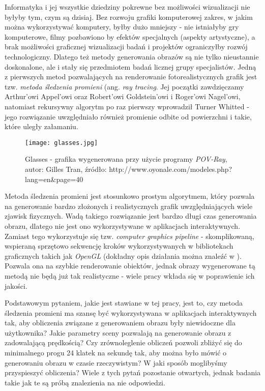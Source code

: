 Informatyka i jej wszystkie dziedziny pokrewne bez możliwości wizualizacji nie byłyby tym, czym są dzisiaj. Bez rozwoju grafiki komputerowej zakres, w jakim można wykorzystywać komputery, byłby dużo mniejszy - nie istniałyby gry komputerowe, filmy pozbawiono by efektów specjalnych (aspekty artystyczne), a brak możliwości graficznej wizualizacji badań i projektów ograniczyłby rozwój technologiczny. Dlatego też metody generowania obrazów są nie tylko nieustannie doskonalone, ale i stały się przedmiotem badań licznej grupy specjalistów. Jedną z pierwszych metod pozwalających na renderowanie fotorealistycznych grafik jest tzw. \emph{metoda śledzenia promieni} (ang. \emph{ray tracing}. Jej początki zawdzięczamy Arthur'owi Appel'owi oraz Robert'owi Goldstein'owi i Roger'owi Nagel'owi, natomiast rekursywny algorytm po raz pierwszy wprowadził Turner Whitted - jego rozwiązanie uwzględniało również promienie odbite od powierzchni i takie, które uległy załamaniu.

\begin{figure}[H]
\centering
\texttt{[image: glasses.jpg]}
\caption{Glasses - grafika wygenerowana przy użycie programy \emph{POV-Ray}, autor: Gilles Tran, źródło: http://www.oyonale.com/modeles.php?lang=en\&page=40}
\end{figure}

Metoda śledzenia promieni jest stosunkowo prostym algorytmem, który pozwala na generowanie bardzo złożonych i realistycznych grafik uwzględniających wiele zjawisk fizycznych. Wadą takiego rozwiązanie jest bardzo długi czas generowania obrazu, dlatego nie jest ono wykorzystywane w aplikacjach interaktywnych. Zamiast tego wykorzystuje się tzw. \emph{computer graphics pipeline} - skomplikowaną, wspieraną sprzętowo sekwencję kroków wykorzystywanych w bibliotekach graficznych takich jak \emph{OpenGL} (dokładny opis działania można znaleźć w \cite{gpipe}). Pozwala ona na szybkie renderowanie obiektów, jednak obrazy wygenerowane tą metodą nie będą już tak realistyczne - wiele pracy wkłada się w poprawienie ich jakości.

Podstawowym pytaniem, jakie jest stawiane w tej pracy, jest to, czy metoda śledzenia promieni ma szansę być wykorzystywana w aplikacjach interaktywnych tak, aby obliczenia związane z generowaniem obrazu były niewidoczne dla użytkownika? Jakie parametry sceny pozwalają na generowanie obrazu z zadowalającą prędkością? Czy zrównoleglenie obliczeń pozwoli zbliżyć się do minimalnego progu 24 klatek na sekundę tak, aby można było mówić o generowaniu obrazu w czasie rzeczywistym? W jaki sposób moglibyśmy przyspieszyć obliczenia?  Wiele z tych pytań pozostanie otwartych, jednak badania takie jak te są próbą znalezienia na nie odpowiedzi.


